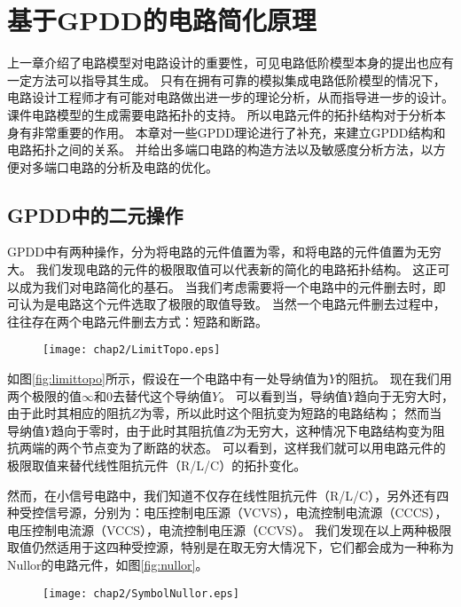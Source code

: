 \chapter{基于GPDD的电路简化原理}
\label{chap:gpddtheory}

上一章介绍了电路模型对电路设计的重要性，可见电路低阶模型本身的提出也应有一定方法可以指导其生成。
只有在拥有可靠的模拟集成电路低阶模型的情况下，电路设计工程师才有可能对电路做出进一步的理论分析，从而指导进一步的设计。
课件电路模型的生成需要电路拓扑的支持。
所以电路元件的拓扑结构对于分析本身有非常重要的作用。
本章对一些GPDD理论进行了补充，来建立GPDD结构和电路拓扑之间的关系。
并给出多端口电路的构造方法以及敏感度分析方法，以方便对多端口电路的分析及电路的优化。

\section{GPDD中的二元操作}

GPDD中有两种操作，分为将电路的元件值置为零，和将电路的元件值置为无穷大。
我们发现电路的元件的极限取值可以代表新的简化的电路拓扑结构。
这正可以成为我们对电路简化的基石。
当我们考虑需要将一个电路中的元件删去时，即可认为是电路这个元件选取了极限的取值导致。
当然一个电路元件删去过程中，往往存在两个电路元件删去方式：短路和断路。

\begin{figure}[!htp]
	\centering
	\texttt{[image: chap2/LimitTopo.eps]}
\end{figure}

如图\ref{fig:limittopo}所示，假设在一个电路中有一处导纳值为$Y$的阻抗。
现在我们用两个极限的值$\infty$和$0$去替代这个导纳值$Y$。
可以看到当，导纳值$Y$趋向于无穷大时，由于此时其相应的阻抗$Z$为零，所以此时这个阻抗变为短路的电路结构；
然而当导纳值$Y$趋向于零时，由于此时其阻抗值$Z$为无穷大，这种情况下电路结构变为阻抗两端的两个节点变为了断路的状态。
可以看到，这样我们就可以用电路元件的极限取值来替代线性阻抗元件（R/L/C）的拓扑变化。

然而，在小信号电路中，我们知道不仅存在线性阻抗元件（R/L/C），另外还有四种受控信号源，分别为：电压控制电压源（VCVS），电流控制电流源（CCCS），电压控制电流源（VCCS），电流控制电压源（CCVS）。
我们发现在以上两种极限取值仍然适用于这四种受控源，特别是在取无穷大情况下，它们都会成为一种称为Nullor的电路元件，如图\ref{fig:nullor}。

\begin{figure}[!htp]
	\centering
	\texttt{[image: chap2/SymbolNullor.eps]}
\end{figure}

